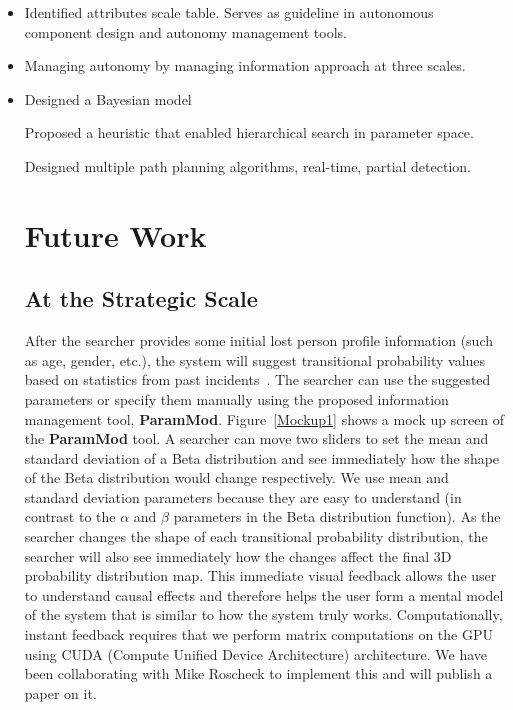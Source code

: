 \begin{itemize}
\item Identified attributes scale table. Serves as guideline in autonomous component design and autonomy management tools.
\item Managing autonomy by managing information approach at three scales.
\item 
Designed a Bayesian model

Proposed a heuristic that enabled hierarchical search in parameter space.

Designed multiple path planning algorithms, real-time, partial detection.





\section{Future Work}
\label{futurework}

\subsection{At the Strategic Scale}

After the searcher provides some initial lost person profile information (such as age, gender, etc.), the system will suggest transitional probability values based on statistics from past incidents~\cite{Koester2008Lost}. The searcher can use the suggested parameters or specify them manually using the proposed information management tool, \textbf{ParamMod}. Figure~\ref{Mockup1} shows a mock up screen of the \textbf{ParamMod} tool. A searcher can move two sliders to set the mean and standard deviation of a Beta distribution and see immediately how the shape of the Beta distribution would change respectively. We use mean and standard deviation parameters because they are easy to understand (in contrast to the $\alpha$ and $\beta$ parameters in the Beta distribution function). As the searcher changes the shape of each transitional probability distribution, the searcher will also see immediately how the changes affect the final 3D probability distribution map. This immediate visual feedback allows the user to understand causal effects and therefore helps the user form a mental model of the system that is similar to how the system truly works. Computationally, instant feedback requires that we perform matrix computations on the GPU using CUDA (Compute Unified Device Architecture) architecture. We have been collaborating with Mike Roscheck to implement this and will publish a paper on it.


\end{itemize}
